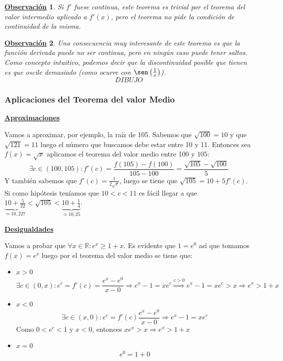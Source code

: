 \documentclass[10pt,a4paper,openright]{book}
\theoremstyle{break}
\newtheorem{obs}{\underline{Observación}}[chapter]
\begin{document}
\begin{obs}
Si $f'$ fuese continua, este teorema es trivial por el teorema del valor intermedio aplicado a $f'(x)$, pero el teorema no pide la condición de continuidad de la misma.
\end{obs}

\begin{obs}
Una consecuencia muy interesante de este teorema es que la función derivada puede no ser continua, pero en ningún caso puede tener saltos. Como concepto intuitivo, podemos decir que la discontinuidad posible que tienen es que oscile demasiado (como ocurre con $\sen\left(\frac{1}{x}\right)$).
$$DIBUJO$$
\end{obs}

\subsubsection{Aplicaciones del Teorema del valor Medio}
\underline{\textbf{Aproximaciones}}

Vamos a aproximar, por ejemplo, la raíz de 105. Sabemos que $\sqrt{100}=10$ y que $\sqrt{121}=11$ luego el número que buscamos debe estar entre 10 y 11. Entonces sea $f(x)=\sqrt{x}$ aplicamos el teorema del valor medio entre 100 y $105$:
$$\exists c\in (100, 105):f'(c)=\frac{f(105)-f(100)}{105-100}=\frac{\sqrt{105}-\sqrt{100}}{5}$$
Y también sabemos que $f'(c)=\frac{1}{2\sqrt{c}}$, luego se tiene que $\sqrt{105}=10+5f'(c)$. Si como hipótesis teníamos que $10<c<11$ es fácil llegar a que $\underbrace{10+\frac{5}{22}}_{\simeq 10,227}< \sqrt{105} < \underbrace{10+\frac{1}{4}}_{\simeq 10,25}$.

\underline{\textbf{Desigualdades}}

Vamos a probar que $\forall x \in \mathbb R: e^x \geq 1+x$. Es evidente que $1=e^0$ así que tomamos $f(x)=e^x$ luego por el teorema del valor medio se tiene que:
\begin{itemize}
\item $x>0$
$$\exists c\in (0,x): e^c=f'(c)=\frac{e^x-e^0}{x-0}\Rightarrow e^x-1=xe^c\stackrel{c>0}{\Rightarrow} e^x-1=xe^c>x\Rightarrow e^x>1+x$$

\item $x<0$
$$\exists c\in (x,0): e^c=f'(c)\frac{e^x-e^0}{x-0}\Rightarrow e^x-1=xe^c$$
Como $0<e^c<1$ y $x<0$, entonces $xe^x>x\Rightarrow e^x>1+x$

\item $x=0$
$$e^0=1+0$$
\end{itemize}
\end{document}
